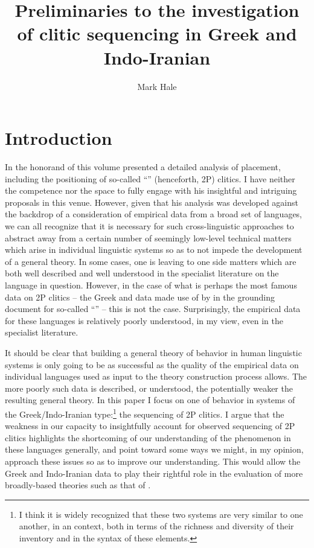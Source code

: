 \documentclass[output=paper,
modfonts
]{LSP/langsci}
\title{Preliminaries to the investigation of clitic sequencing in Greek and Indo-Iranian}
\author{%
 Mark Hale\affiliation{Concordia University, Montréal}
}
\begin{document}
\maketitle



\section{Introduction}
In \citet{anderson2005} the honorand of this volume presented a detailed analysis
of  placement, including the positioning of so-called ``''
(henceforth, 2P) clitics. I have neither the competence nor the space to
fully engage with his insightful and intriguing proposals in this venue.
However, given that his analysis was developed against the backdrop of a
consideration of empirical data from a broad set of languages, we can
all recognize that it is necessary for such cross-linguistic approaches to abstract away
from a certain number of seemingly low-level technical matters which
arise in individual linguistic systems so as to not impede the development
of a general theory. In some cases, one is leaving to one side matters
which are both well described and well understood in the specialist literature
on the language in question. However, in the case of what is perhaps
the most famous data on 2P clitics -- the Greek and  data made use of 
by \citet{wackernagel1892} in the grounding document for so-called ``'' -- this 
is not the case. Surprisingly, the empirical data for these languages is relatively
poorly understood, in my view, even in the specialist literature. 

It should be clear that building a general theory of  behavior in human
linguistic systems is only going to be as successful as the quality of the empirical data
on individual languages used as input to the theory construction process allows.
The more poorly such data is described, or understood, the potentially weaker the resulting
general theory. In this paper I focus on one  of  behavior in
systems of the Greek/Indo-Iranian type:\footnote{I think it is widely recognized that these
two systems are very similar to one another, in an  context, both in terms
of the richness and diversity of their  inventory and in the syntax of these
elements.} the sequencing of 2P clitics. I argue that the weakness in our capacity
to insightfully account for observed sequencing of 2P clitics highlights the
shortcoming of our understanding of the phenomenon in these languages generally,
and point toward some ways we might, in my opinion, approach these issues so as
to improve our understanding. This would allow the Greek and Indo-Iranian data to
play their rightful role in the evaluation of more broadly-based theories such as
that of \citet{anderson2005}.
\end{document}
